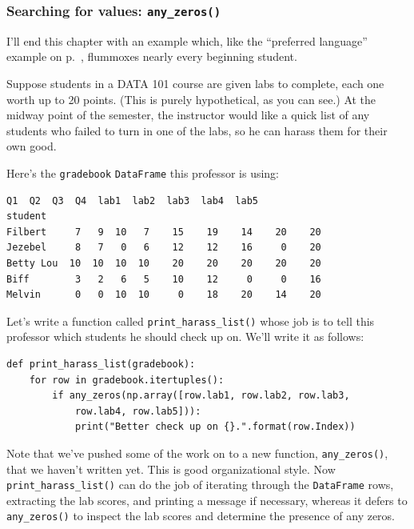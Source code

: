 \smallskip

\subsubsection{Searching for values: \texttt{any\_zeros()}}

I'll end this chapter with an example which, like the ``preferred language''
example on p.~\pageref{spanishFrenchPitfall}, flummoxes nearly every beginning
student.

Suppose students in a DATA 101 course are given labs to complete, each one
worth up to 20 points. (This is purely hypothetical, as you can see.) At the
midway point of the semester, the instructor would like a quick list of any
students who failed to turn in one of the labs, so he can harass them for their
own good.


Here's the \texttt{gradebook} \texttt{DataFrame} this professor is using:

\begin{Verbatim}[fontsize=\footnotesize,samepage=true,frame=leftline,framesep=5mm,framerule=1mm]
           Q1  Q2  Q3  Q4  lab1  lab2  lab3  lab4  lab5
student                                                
Filbert     7   9  10   7    15    19    14    20    20
Jezebel     8   7   0   6    12    12    16     0    20
Betty Lou  10  10  10  10    20    20    20    20    20
Biff        3   2   6   5    10    12     0     0    16
Melvin      0   0  10  10     0    18    20    14    20
\end{Verbatim}


Let's write a function called \texttt{print\_harass\_list()} whose job is to
tell this professor which students he should check up on. We'll write it as
follows:

\begin{Verbatim}[fontsize=\footnotesize,samepage=true,frame=single,framesep=3mm]
def print_harass_list(gradebook):
    for row in gradebook.itertuples():
        if any_zeros(np.array([row.lab1, row.lab2, row.lab3,
            row.lab4, row.lab5])):
            print("Better check up on {}.".format(row.Index))
\end{Verbatim}


Note that we've pushed some of the work on to a new function,
\texttt{any\_zeros()}, that we haven't written yet. This is good organizational
style. Now \texttt{print\_harass\_list()} can do the job of iterating through
the \texttt{DataFrame} rows, extracting the lab scores, and printing a message
if necessary, whereas it defers to \texttt{any\_zeros()} to inspect the lab
scores and determine the presence of any zeros.

